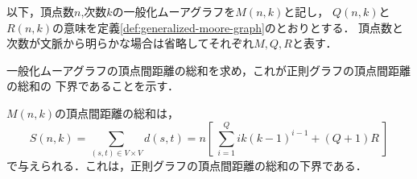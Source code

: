 以下，頂点数$n$,次数$k$の一般化ムーアグラフを$M(n,k)$と記し，
$Q(n,k)$と$R(n,k)$の意味を定義\ref{def:generalized-moore-graph}のとおりとする．
頂点数と次数が文脈から明らかな場合は省略してそれぞれ$M,Q,R$と表す．

一般化ムーアグラフの頂点間距離の総和を求め，これが正則グラフの頂点間距離の総和の
下界であることを示す．
\begin{theorem}
  \label{thm:gmg-lower-bound}
  $M(n,k)$の頂点間距離の総和は，
  \begin{equation}
    \label{eq:gmg-lb}
    S(n,k) = \sum_{(s,t)\in V\times V}d(s,t) =
    n \left[\ \sum^{Q}_{i=1}ik(k-1)^{i-1} + (Q+1)R\ \right]
  \end{equation}
  で与えられる．これは，正則グラフの頂点間距離の総和の下界である．
\end{theorem}
